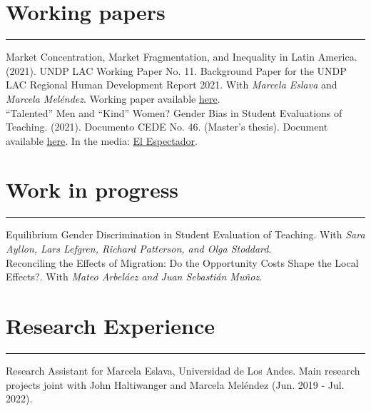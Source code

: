 \documentclass[12pt, letterpaper]{article}
\begin{document}
\vspace*{-4mm}

\section*{Working papers}
\vspace*{-8mm}
\noindent \rule{\linewidth}{0.2mm}

\noindent Market Concentration, Market Fragmentation, and Inequality in Latin America. (2021). UNDP LAC Working Paper No. 11. Background Paper for the UNDP LAC Regional Human Development Report 2021.  With \textit{Marcela Eslava} and \textit{Marcela Meléndez}. Working paper available \href{https://www.latinamerica.undp.org/content/rblac/en/home/library/poverty/market-concentration--market-fragmentation--and-inequality-in-la.html}{here}. \\ [-3mm]

\noindent ``Talented'' Men and ``Kind'' Women? Gender Bias in Student Evaluations of Teaching. (2021). Documento CEDE No. 46. (Master's thesis). Document available \href{https://papers.ssrn.com/sol3/papers.cfm?abstract_id=3919797}{here}. In the media: \href{https://www.elespectador.com/educacion/los-profes-crack-y-las-profes-amables-el-sesgo-de-genero-en-las-aulas/}{El Espectador}.

\vspace{-5mm}

\section*{Work in progress}
\vspace*{-8mm}
\noindent \rule{\linewidth}{0.2mm}
\noindent Equilibrium Gender Discrimination in Student Evaluation of Teaching. With \textit{Sara Ayllon, Lars Lefgren, Richard Patterson, and Olga Stoddard}. \\ [-3mm]

\noindent Reconciling the Effects of Migration: Do the Opportunity Costs Shape the Local Effects?. With \textit{Mateo Arbeláez and Juan Sebastián Muñoz}. \\ [-3mm]

\vspace{-6mm}

\section*{Research Experience}
\vspace*{-8mm}
\noindent \rule{\linewidth}{0.2mm}
\noindent
Research Assistant for Marcela Eslava, Universidad de Los Andes. Main research projects joint with John Haltiwanger and Marcela Meléndez (Jun. 2019 - Jul. 2022).  \\ 
\end{document}

